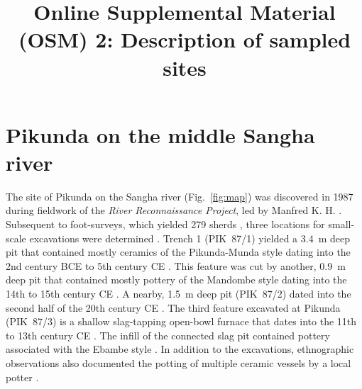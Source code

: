\documentclass[a4paper]{article}
\title{Online Supplemental Material (OSM) 2: Description of sampled sites}
\begin{document}
\setcounter{figure}{6}
\setcounter{table}{1}

\maketitle

\tableofcontents

\vspace{20em}

\section{Pikunda on the middle Sangha river}

The site of Pikunda on the Sangha river (Fig.~\ref{fig:map}) was discovered in 1987 during fieldwork of the \textit{River Reconnaissance Project}, led by Manfred K. H. \citet{Eggert.1992,Eggert.1993}. Subsequent to foot-surveys, which yielded 279 sherds \citep[345]{Seidensticker.2021e}, three locations for small-scale excavations were determined \citep[288--305]{Seidensticker.2021e}. Trench 1 (PIK~87/1) yielded a 3.4~m deep pit that contained mostly ceramics of the Pikunda-Munda style dating into the 2nd century BCE to 5th century CE \citep[Fig.\ref{fig:chrono};][114--120]{Seidensticker.2021e}. This feature was cut by another, 0.9~m deep pit that contained mostly pottery of the Mandombe style dating into the 14th to 15th century CE \citep[Fig.\ref{fig:chrono};][145--148, 291 Fig.~133, 293 Fig.~135B]{Seidensticker.2021e}. A nearby, 1.5~m deep pit (PIK~87/2) dated into the second half of the 20th century CE \citep[300--301]{Seidensticker.2021e}. The third feature excavated at Pikunda (PIK~87/3) is a shallow slag-tapping open-bowl furnace that dates into the 11th to 13th century CE \citep[299 Fig.~138, 301--305]{Seidensticker.2021e}. The infill of the connected slag pit contained pottery associated with the Ebambe style \citep[131--136]{Seidensticker.2021e}. In addition to the excavations, ethnographic observations also documented the potting of multiple ceramic vessels by a local potter \citep{Eggert.inVorb.}.
\end{document}
